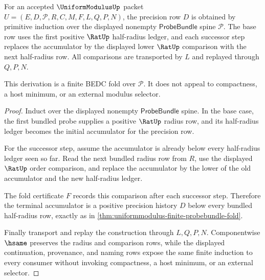 \begin{theorem}
\label{thm:uniformmodulus-probebundle-induction-derivation}
For an accepted $\UniformModulusUp$ packet $U=(E,D,\mathcal{P},R,C,M,F,L,Q,P,N)$, the precision row $D$ is obtained by primitive induction over the displayed nonempty $\mathsf{ProbeBundle}$ spine $\mathcal{P}$. The base row uses the first positive $\RatUp$ half-radius ledger, and each successor step replaces the accumulator by the displayed lower $\RatUp$ comparison with the next half-radius row. All comparisons are transported by $L$ and replayed through $Q,P,N$.

This derivation is a finite BEDC fold over $\mathcal{P}$. It does not appeal to compactness, a host minimum, or an external modulus selector.
\end{theorem}
\begin{proof}
Induct over the displayed nonempty $\mathsf{ProbeBundle}$ spine. In the base case, the first bundled probe supplies a positive $\RatUp$ radius row, and its half-radius ledger becomes the initial accumulator for the precision row.

For the successor step, assume the accumulator is already below every half-radius ledger seen so far. Read the next bundled radius row from $R$, use the displayed $\RatUp$ order comparison, and replace the accumulator by the lower of the old accumulator and the new half-radius ledger.

The fold certificate $F$ records this comparison after each successor step. Therefore the terminal accumulator is a positive precision history $D$ below every bundled half-radius row, exactly as in \autoref{thm:uniformmodulus-finite-probebundle-fold}.

Finally transport and replay the construction through $L,Q,P,N$. Componentwise $\hsame$ preserves the radius and comparison rows, while the displayed continuation, provenance, and naming rows expose the same finite induction to every consumer without invoking compactness, a host minimum, or an external selector.
\end{proof}

